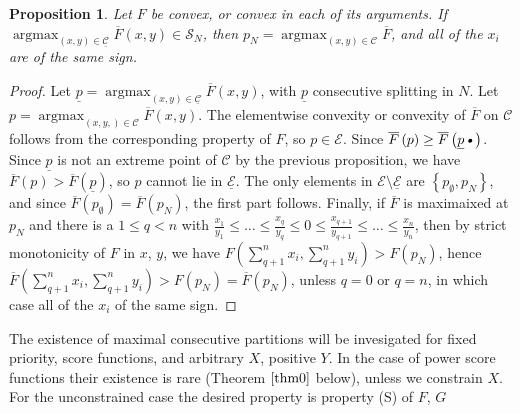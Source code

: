 \documentclass{article}
\newtheorem{prop}{Proposition}
\theoremstyle{case}
\DeclareMathOperator*{\argmax}{argmax} %
\begin{document}
\begin{prop}
Let $F$ be convex, or convex in each of its arguments. If $\argmax_{\left( x,y\right) \in \underline{\mathcal{C}}} \overline{F}\left( x,y\right) \in \mathcal{S}_N$, then $p_N = \argmax_{\left( x,y\right) \in \mathcal{C}} \overline{F}$, and all of the $x_i$ are of the same sign.
\end{prop}
\begin{proof}
Let $\underline{p} = \argmax_{\left( x,y\right) \in \underline{\mathcal{C}}} \overline{F}\left( x,y\right)$, with $\underline{p}$ consecutive splitting in $N$. Let $p = \argmax_{\left( x,y,\right) \in \mathcal{C}} \overline{F}\left( x,y\right)$. The elementwise convexity or convexity of $\overline{F}$ on $\mathcal{C}$ follows from the corresponding property of $F$, so $p \in \mathcal{E}$. Since $\overline{F}\left( p\right) \geq \overline{F}\left( \underline{p}\textsl{•}\right)$. Since $\underline{p}$ is not an extreme point of $\mathcal{C}$ by the previous proposition, we have $\overline{F}\left( p\right) > \overline{F}\left( \underline{p}\right)$, so $p$ cannot lie in $\underline{\mathcal{E}}$. The only elements in $\mathcal{E}\setminus \underline{\mathcal{E}}$ are $\left\lbrace p_{\emptyset}, p_{N}\right\rbrace$, and since $\overline{F}\left( p_{\emptyset}\right) = \overline{F}\left( p_N\right)$, the first part follows. Finally, if $\overline{F}$ is maximaixed at $p_N$ and there is a $1 \leq q < n$ with $\frac{x_1}{y_1} \leq \dots \leq \frac{x_q}{y_q} \leq 0 \leq \frac{x_{q+1}}{y_{q+1}} \leq \dots \leq \frac{x_n}{y_n}$, then by strict monotonicity of $F$ in $x$, $y$, we have $F\left( \sum_{q+1}^n x_i, \sum_{q+1}^n y_i\right) > F\left( p_N\right)$, hence $\overline{F}\left( \sum_{q+1}^n x_i, \sum_{q+1}^n y_i\right) > F\left( p_N\right) = \overline{F}\left( p_N\right)$, unless $q = 0$ or $q = n$, in which case all of the $x_i$ of the same sign.
\end{proof}

The existence of maximal consecutive partitions will be invesigated for fixed priority, score functions, and arbitrary $X$, positive $Y$. In the case of power score functions their existence is rare (Theorem $\ref{thm0}$ below), unless we constrain $X$. For the unconstrained case the desired property is property (S) of $F$, $G$
\vspace{8pt}
\end{document}
